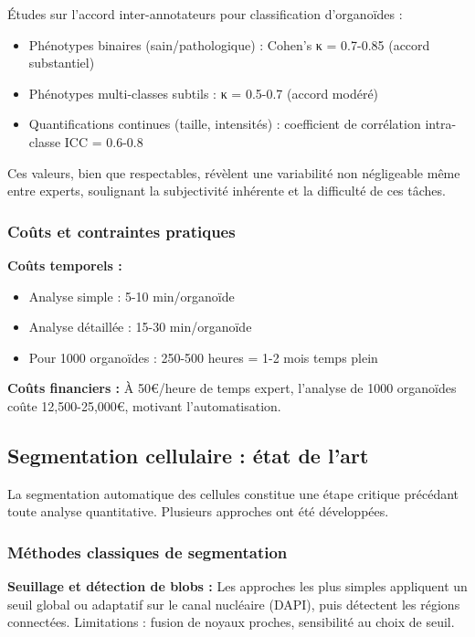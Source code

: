 Études sur l'accord inter-annotateurs pour classification d'organoïdes :
\begin{itemize}
    \item Phénotypes binaires (sain/pathologique) : Cohen's κ = 0.7-0.85 (accord substantiel)
    \item Phénotypes multi-classes subtils : κ = 0.5-0.7 (accord modéré)
    \item Quantifications continues (taille, intensités) : coefficient de corrélation intra-classe ICC = 0.6-0.8
\end{itemize}

Ces valeurs, bien que respectables, révèlent une variabilité non négligeable même entre experts, soulignant la subjectivité inhérente et la difficulté de ces tâches.

\subsubsection{Coûts et contraintes pratiques}

\textbf{Coûts temporels :}
\begin{itemize}
    \item Analyse simple : 5-10 min/organoïde
    \item Analyse détaillée : 15-30 min/organoïde
    \item Pour 1000 organoïdes : 250-500 heures = 1-2 mois temps plein
\end{itemize}

\textbf{Coûts financiers :}
À 50€/heure de temps expert, l'analyse de 1000 organoïdes coûte 12,500-25,000€, motivant l'automatisation.

\subsection{Segmentation cellulaire : état de l'art}

La segmentation automatique des cellules constitue une étape critique précédant toute analyse quantitative. Plusieurs approches ont été développées.

\subsubsection{Méthodes classiques de segmentation}

\textbf{Seuillage et détection de blobs :}
Les approches les plus simples appliquent un seuil global ou adaptatif sur le canal nucléaire (DAPI), puis détectent les régions connectées. Limitations : fusion de noyaux proches, sensibilité au choix de seuil.


